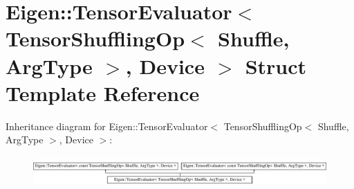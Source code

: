 \hypertarget{struct_eigen_1_1_tensor_evaluator_3_01_tensor_shuffling_op_3_01_shuffle_00_01_arg_type_01_4_00_01_device_01_4}{}\section{Eigen\+:\+:Tensor\+Evaluator$<$ Tensor\+Shuffling\+Op$<$ Shuffle, Arg\+Type $>$, Device $>$ Struct Template Reference}
\label{struct_eigen_1_1_tensor_evaluator_3_01_tensor_shuffling_op_3_01_shuffle_00_01_arg_type_01_4_00_01_device_01_4}
Inheritance diagram for Eigen\+:\+:Tensor\+Evaluator$<$ Tensor\+Shuffling\+Op$<$ Shuffle, Arg\+Type $>$, Device $>$\+:\begin{figure}[H]
\begin{center}
\leavevmode
\includegraphics[height=1.149897cm]{struct_eigen_1_1_tensor_evaluator_3_01_tensor_shuffling_op_3_01_shuffle_00_01_arg_type_01_4_00_01_device_01_4}
\end{center}
\end{figure}
